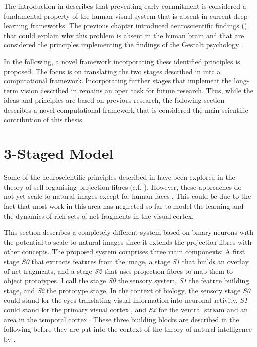 The introduction in  describes that preventing early commitment is considered a fundamental property of the human visual system that is absent in current deep learning frameworks.
The previous chapter introduced neuroscientific findings () that could explain why this problem is absent in the human brain and that are considered the principles implementing the findings of the Gestalt psychology .

In the following, a novel framework incorporating these identified principles is proposed.
The focus is on translating the two stages described in  into a computational framework.
Incorporating further stages that implement the long-term vision described in  remains an open task for future research.
Thus, while the ideas and principles are based on previous research, the following section describes a novel computational framework that is considered the main scientific contribution of this thesis.

\section{3-Staged Model}
Some of the neuroscientific principles described in  have been explored in the theory of self-organising projection fibres (c.f. ). However, these approaches do not yet scale to natural images except for human faces \cite{wolfrum_recurrent_2008}. This could be due to the fact that most work in this area has neglected so far to model the learning and the dynamics of rich sets of net fragments in the visual cortex.

This section describes a completely different system based on binary neurons with the potential to scale to natural images since it extends the projection fibres with other concepts.
The proposed system comprises three main components: A first stage \emph{S0} that extracts features from the image, a stage \emph{S1} that builds an overlay of net fragments, and a stage \emph{S2} that uses projection fibres to map them to object prototypes.
I call the stage \emph{S0} the sensory system, \emph{S1} the feature building stage, and \emph{S2} the prototype stage.
In the context of biology, the sensory stage \emph{S0} could stand for the eyes translating visual information into neuronal activity, \emph{S1} could stand for the primary visual cortex , and \emph{S2} for the ventral stream and an area in the temporal cortex .
These three building blocks are described in the following before they are put into the context of the theory of natural intelligence by .

